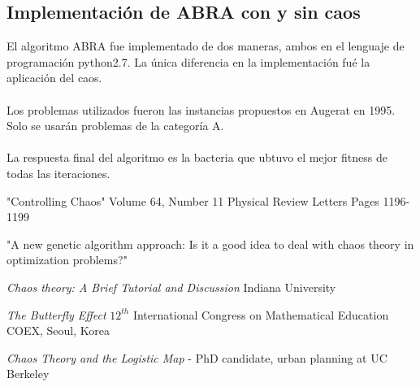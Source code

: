 \documentclass[DIV=calc, paper=a4, fontsize=11pt, twocolumn]{scrartcl}	 %
\begin{document}
\subsection*{Implementación de ABRA con y sin caos}
El algoritmo ABRA fue implementado de dos maneras, ambos en el lenguaje de programación python2.7. La única diferencia en la implementación fué la aplicación del caos. \\\\Los problemas utilizados fueron las instancias propuestos en Augerat en 1995. Solo se usarán problemas de la categoría A. \\\\La respuesta final del algoritmo es la bacteria que ubtuvo el mejor fitness de todas las iteraciones.

\begin{thebibliography}{99} %

\newblock "Controlling Chaos" Volume 64, Number 11 Physical Review Letters
\newblock  Pages 1196-1199

\newblock "A new genetic algorithm approach: Is it a good
idea to deal with chaos theory in optimization
problems?"
  
\newblock \emph{Chaos theory: A Brief Tutorial and Discussion} Indiana University

\newblock \emph{The Butterfly Effect} $12^{th}$ International Congress on Mathematical Education
COEX, Seoul, Korea
 
\newblock \emph{Chaos Theory and the Logistic Map} - PhD candidate, urban planning at UC Berkeley
\end{thebibliography}

\end{document}

